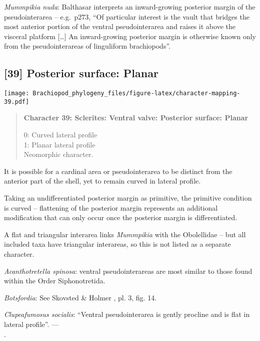 \documentclass[openany]{book}
\theoremstyle{definition}
\theoremstyle{definition}
\theoremstyle{definition}
\theoremstyle{remark}
\begin{document}
\hypertarget{Mummpikia_nuda-coding-38}{}
\emph{Mummpikia nuda}: Balthasar \citeyearpar{Balthasar2008iMummpikia}
interprets an inward-growing posterior margin of the pseudointerarea --
e.g.~p273, ``Of particular interest is the vault that bridges the most
anterior portion of the ventral pseudointerarea and raises it above the
visceral platform {[}\ldots{}{]} An inward-growing posterior margin is
otherwise known only from the pseudointerareas of linguliform
brachiopods''.

\subsection*{{[}39{]} Posterior surface:
Planar}\label{posterior-surface-planar}

\texttt{[image: Brachiopod\_phylogeny\_files/figure-latex/character-mapping-39.pdf]}

\begin{quote}
\textbf{Character 39: Sclerites: Ventral valve: Posterior surface:
Planar}

0: Curved lateral profile\\
1: Planar lateral profile\\
Neomorphic character.
\end{quote}

It is possible for a cardinal area or pseudointerarea to be distinct
from the anterior part of the shell, yet to remain curved in lateral
profile.

Taking an undifferentiated posterior margin as primitive, the primitive
condition is curved -- flattening of the posterior margin represents an
additional modification that can only occur once the posterior margin is
differentiated.

A flat and triangular interarea links \emph{Mummpikia} with the
Obolellidae \citep{Balthasar2008iMummpikia} -- but all included taxa
have triangular interareas, so this is not listed as a separate
character.

\hypertarget{Acanthotretella_spinosa-coding-39}{}
\emph{Acanthotretella spinosa}: ventral pseudointerareas are most
similar to those found within the Order Siphonotretida.

\hypertarget{Botsfordia-coding-39}{}
\emph{Botsfordia}: See Skovsted \& Holmer
\citeyearpar{Skovsted2005EarlyCambrian}, pl. 3, fig. 14.

\hypertarget{Clupeafumosus_socialis-coding-39}{}
\emph{Clupeafumosus socialis}: ``Ventral pseudointerarea is gently
procline and is flat in lateral profile''. ---\\
\citep{Topper2013Reappraisalof}.
\end{document}
